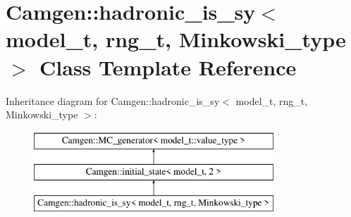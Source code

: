 \hypertarget{a00255}{\section{Camgen\-:\-:hadronic\-\_\-is\-\_\-sy$<$ model\-\_\-t, rng\-\_\-t, Minkowski\-\_\-type $>$ Class Template Reference}
\label{a00255}
}
Inheritance diagram for Camgen\-:\-:hadronic\-\_\-is\-\_\-sy$<$ model\-\_\-t, rng\-\_\-t, Minkowski\-\_\-type $>$\-:\begin{figure}[H]
\begin{center}
\leavevmode
\includegraphics[height=3.000000cm]{a00255}
\end{center}
\end{figure}
